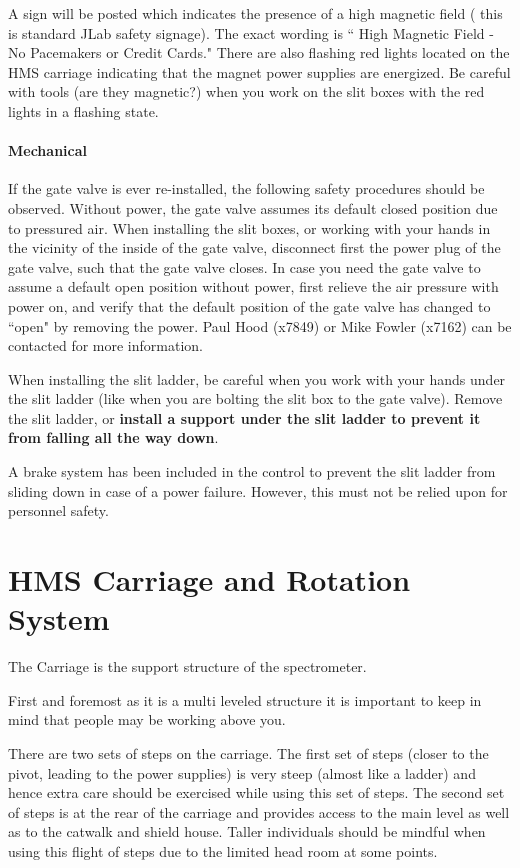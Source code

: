 {A sign will be posted which indicates the presence of a high magnetic
field ( this is standard JLab safety signage). The exact wording is
`` High Magnetic Field - No Pacemakers or Credit Cards." There are also
flashing red lights located on the HMS carriage indicating that the
magnet power supplies are energized. Be careful with tools (are they magnetic?)
when you work on the slit boxes with the red lights in a flashing state.

\paragraph{Mechanical}

If the gate valve is ever re-installed, the following safety
procedures should be observed.  Without power, the gate valve assumes its default closed position due to
pressured air. When installing the slit boxes, or working with your hands
in the vicinity of the inside of the gate valve, disconnect first the power
plug of the gate valve, such that the gate valve closes.
In case you need the gate valve to assume a default open position without
power, first relieve the air pressure
with power on, and verify that the default position of the gate valve has
changed to ``open" by removing the power. Paul Hood (x7849) or Mike Fowler
(x7162) can be contacted for more information.

When installing the slit ladder, be careful when you work with your hands
under the slit ladder (like when you are bolting the slit box to the
gate valve). Remove the slit ladder, or {\bf install a support under the slit
ladder to prevent it from falling all the way down}.

A brake system has been included in the control to prevent the slit ladder
from sliding down in case of a power failure.  However, this must not
be relied upon for personnel safety.


\section{HMS Carriage and Rotation System }

	The Carriage is the support structure of the spectrometer.

First and foremost as it is a multi leveled structure it is important to keep in
mind that people may be working above you. 

There are two sets of steps on the carriage. The first set of steps
(closer to the pivot, leading to the power supplies) is very
steep (almost like a ladder) and hence extra care should be exercised
while using this set of steps. The second set of steps is at the rear
of the carriage and provides access to the main level as well as to
the catwalk and shield house. Taller individuals should be mindful
when using this flight of steps due to the limited head room at some 
points.

}
